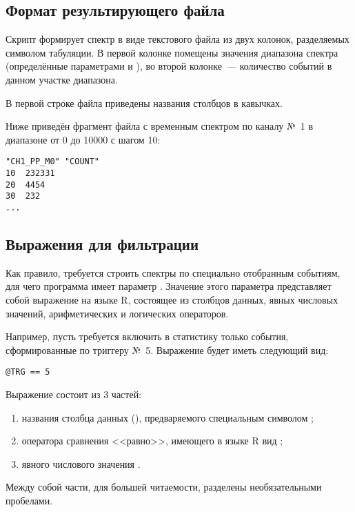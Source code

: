 \subsection{Формат результирующего файла}

Скрипт формирует спектр в виде текстового файла из двух колонок, разделяемых символом табуляции. В первой колонке помещены значения диапазона спектра (определённые параметрами  и ), во второй колонке~--- количество событий в данном участке диапазона.

В первой строке файла приведены названия столбцов в кавычках.

Ниже приведён фрагмент файла с временным спектром по каналу №~1 в диапазоне от 0 до 10000 с шагом 10:

\begin{lstlisting}
"CH1_PP_M0"	"COUNT"
10	232331
20	4454
30	232
...
\end{lstlisting}

\subsection{Выражения для фильтрации}
\label{sec-peaks-distr-1d-filter}

Как правило, требуется строить спектры по специально отобранным событиям, для чего программа имеет параметр . Значение этого параметра представляет собой выражение на языке R, состоящее из столбцов данных, явных числовых значений, арифметических и логических операторов.

Например, пусть требуется включить в статистику только события, сформированные по триггеру №~5. Выражение будет иметь следующий вид:

\begin{lstlisting}
@TRG == 5
\end{lstlisting}

Выражение состоит из 3 частей:

\begin{enumerate}
\item названия столбца данных (), предваряемого специальным символом ;
\item оператора сравнения <<равно>>, имеющего в языке R вид \CMDARG{==};
\item явного числового значения .
\end{enumerate}

Между собой части, для большей читаемости, разделены необязательными пробелами.

